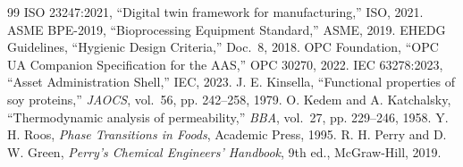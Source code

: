 \documentclass[10pt,letterpaper,twocolumn]{article}
\begin{document}
\begin{thebibliography}{99}
 ISO 23247:2021, ``Digital twin framework for manufacturing,'' ISO, 2021.
 ASME BPE-2019, ``Bioprocessing Equipment Standard,'' ASME, 2019.
 EHEDG Guidelines, ``Hygienic Design Criteria,'' Doc.~8, 2018.
 OPC Foundation, ``OPC UA Companion Specification for the AAS,'' OPC 30270, 2022.
 IEC 63278:2023, ``Asset Administration Shell,'' IEC, 2023.
 J. E. Kinsella, ``Functional properties of soy proteins,'' \textit{JAOCS}, vol.~56, pp. 242--258, 1979.
 O. Kedem and A. Katchalsky, ``Thermodynamic analysis of permeability,'' \textit{BBA}, vol.~27, pp. 229--246, 1958.
 Y. H. Roos, \textit{Phase Transitions in Foods}, Academic Press, 1995.
 R. H. Perry and D. W. Green, \textit{Perry's Chemical Engineers' Handbook}, 9th ed., McGraw-Hill, 2019.
\end{thebibliography}
\end{document}
